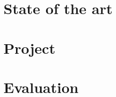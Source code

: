 



\frenchspacing
\raggedbottom
{}
\pagestyle{plain}

\cleardoublepage
\cleardoublepage
\cleardoublepage\tableofcontents
\clearpage
\cleardoublepage
\newpage
{}
\pagestyle{scrheadings}
\sloppy

\part{State of the art}\label{prt:stateOfArt}

\part{Project}\label{prt:project}



\part{Evaluation}\label{prt:evaluation}



\clearpage
\nocite{*}
{}



\printindex


